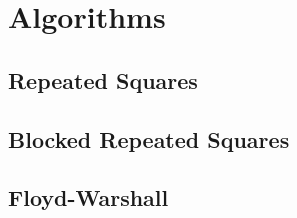 \section{Algorithms}\label{sec:algo}
\subsection{Repeated Squares}
\subsection{Blocked Repeated Squares}
\subsection{Floyd-Warshall}
